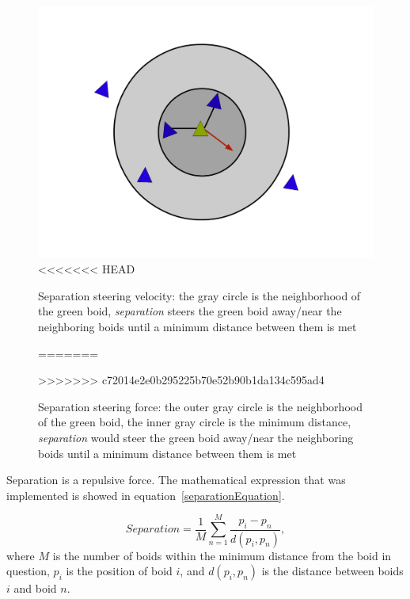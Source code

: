 \begin{figure}[htbp]
\begin{center}
\includegraphics[scale=0.3]{figures/separation.pdf}
<<<<<<< HEAD
\caption{Separation steering velocity: the gray circle is the neighborhood of the green boid, \textit{separation} steers the green boid away/near the neighboring boids until a minimum distance between them is met}
=======
\caption{Separation steering force: the outer gray circle is the neighborhood of the green boid, the inner gray circle is the minimum distance, \textit{separation} would steer the green boid away/near the neighboring boids until a minimum distance between them is met}
>>>>>>> c72014e2e0b295225b70e52b90b1da134c595ad4
\label{separationPDF}
\end{center}
\end{figure}

Separation is a repulsive force. The mathematical expression that was implemented is showed in equation~\ref{separationEquation}.

\begin{equation}
\label{separationEquation}
Separation =\frac{1}{M} \sum_{n=1}^{M} \frac{p_i - p_n}{d(p_i,p_n)},
\end{equation}
where $M$ is the number of boids within the minimum distance from the boid in question, $p_i$ is the position of boid $i$, and $d(p_i,p_n)$ is the distance between boids $i$ and boid $n$.


